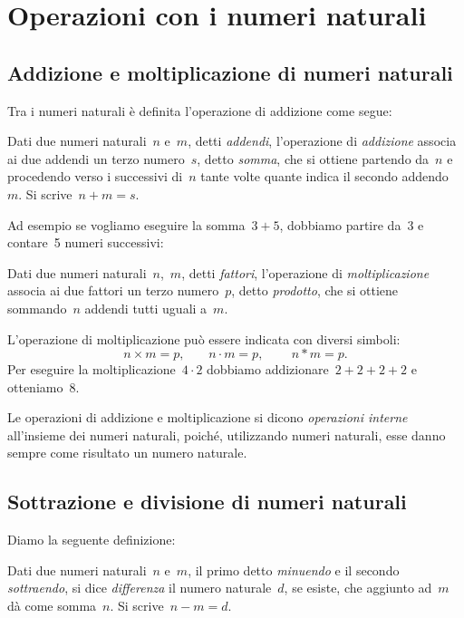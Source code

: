 \section{Operazioni con i numeri naturali}
\subsection{Addizione e moltiplicazione di numeri naturali}

Tra i numeri naturali è definita l'operazione di addizione come segue:

\begin{definizione}
Dati due numeri naturali~$n$ e~$m$, detti \emph{addendi}, l'operazione di \emph{addizione} associa ai
due addendi un terzo numero~$s$, detto \emph{somma}, che si ottiene partendo da~$n$ e procedendo
verso i successivi di~$n$ tante volte quante indica il secondo addendo~$m$. Si scrive~$n+m=s$.
\end{definizione}
Ad esempio se vogliamo eseguire la somma~$3+5$, dobbiamo partire da~3 e contare~5 numeri successivi:



\begin{definizione}
Dati due numeri naturali~$n$,~$m$, detti \emph{fattori}, l'operazione di
\emph{moltiplicazione} associa ai due fattori un terzo numero~$p$, detto \emph{prodotto},
che si ottiene sommando~$n$ addendi tutti uguali a~$m$.
\end{definizione}

L'operazione di moltiplicazione può essere indicata con diversi simboli:
\[n\times m=p\text{,}\qquad n\cdot m=p\text{,~}\qquad n\ast m=p.\]
Per eseguire la moltiplicazione~$4\cdot 2$ dobbiamo addizionare~$2+2+2+2$ e otteniamo~8.

Le operazioni di addizione e moltiplicazione si dicono \emph{operazioni interne} all'insieme dei
numeri naturali, poiché, utilizzando numeri naturali, esse danno sempre come risultato un numero naturale.

 \vspazio\ovalbox{\risolvi \ref{ese:1.1}}

\subsection{Sottrazione e divisione di numeri naturali}

Diamo la seguente definizione:

\begin{definizione}
Dati due numeri naturali~$n$ e~$m$, il primo detto \emph{minuendo} e il secondo \emph{sottraendo}, si
dice \emph{differenza} il numero naturale~$d$, se esiste, che aggiunto ad~$m$ dà come somma~$n$.
Si scrive~$n-m=d$.
\end{definizione}

